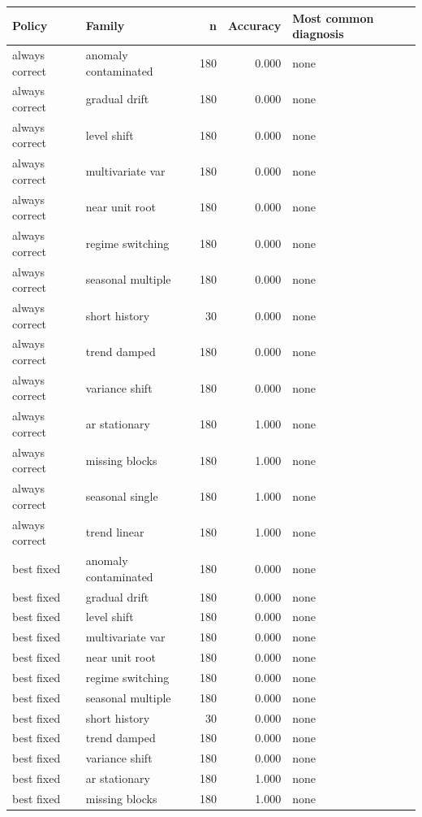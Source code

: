 \begin{tabular}{llrrl}
\toprule
Policy & Family & n & Accuracy & Most common diagnosis \\
\midrule
always correct & anomaly contaminated & 180 & 0.000 & none \\
always correct & gradual drift & 180 & 0.000 & none \\
always correct & level shift & 180 & 0.000 & none \\
always correct & multivariate var & 180 & 0.000 & none \\
always correct & near unit root & 180 & 0.000 & none \\
always correct & regime switching & 180 & 0.000 & none \\
always correct & seasonal multiple & 180 & 0.000 & none \\
always correct & short history & 30 & 0.000 & none \\
always correct & trend damped & 180 & 0.000 & none \\
always correct & variance shift & 180 & 0.000 & none \\
always correct & ar stationary & 180 & 1.000 & none \\
always correct & missing blocks & 180 & 1.000 & none \\
always correct & seasonal single & 180 & 1.000 & none \\
always correct & trend linear & 180 & 1.000 & none \\
best fixed & anomaly contaminated & 180 & 0.000 & none \\
best fixed & gradual drift & 180 & 0.000 & none \\
best fixed & level shift & 180 & 0.000 & none \\
best fixed & multivariate var & 180 & 0.000 & none \\
best fixed & near unit root & 180 & 0.000 & none \\
best fixed & regime switching & 180 & 0.000 & none \\
best fixed & seasonal multiple & 180 & 0.000 & none \\
best fixed & short history & 30 & 0.000 & none \\
best fixed & trend damped & 180 & 0.000 & none \\
best fixed & variance shift & 180 & 0.000 & none \\
best fixed & ar stationary & 180 & 1.000 & none \\
best fixed & missing blocks & 180 & 1.000 & none \\

\end{tabular}
